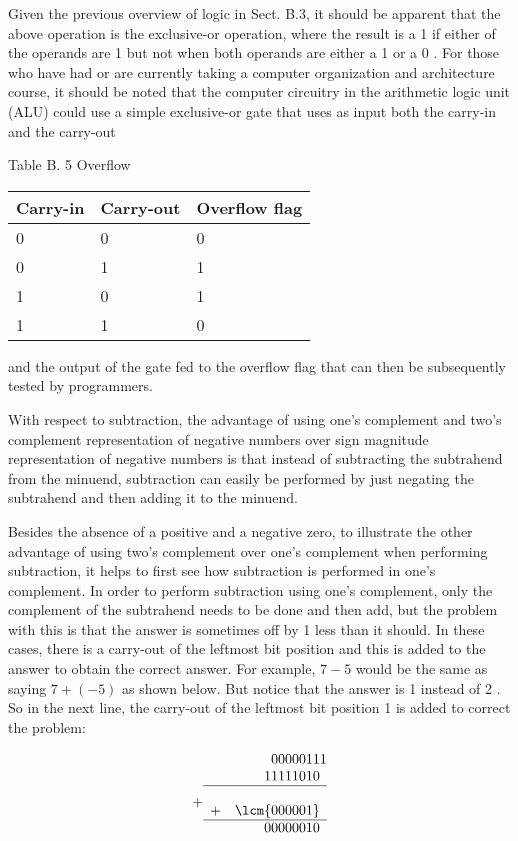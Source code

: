 \documentclass[10pt]{article}
\begin{document}
Given the previous overview of logic in Sect. B.3, it should be apparent that the above operation is the exclusive-or operation, where the result is a 1 if either of the operands are 1 but not when both operands are either a 1 or a 0 . For those who have had or are currently taking a computer organization and architecture course, it should be noted that the computer circuitry in the arithmetic logic unit (ALU) could use a simple exclusive-or gate that uses as input both the carry-in and the carry-out

Table B. 5 Overflow

\begin{center}
\begin{tabular}{|l|l|l|}
\hline
Carry-in & Carry-out & Overflow flag \\
\hline
0 & 0 & 0 \\
\hline
0 & 1 & 1 \\
\hline
1 & 0 & 1 \\
\hline
1 & 1 & 0 \\
\hline
\end{tabular}
\end{center}

and the output of the gate fed to the overflow flag that can then be subsequently tested by programmers.

With respect to subtraction, the advantage of using one's complement and two's complement representation of negative numbers over sign magnitude representation of negative numbers is that instead of subtracting the subtrahend from the minuend, subtraction can easily be performed by just negating the subtrahend and then adding it to the minuend.

Besides the absence of a positive and a negative zero, to illustrate the other advantage of using two's complement over one's complement when performing subtraction, it helps to first see how subtraction is performed in one's complement. In order to perform subtraction using one's complement, only the complement of the subtrahend needs to be done and then add, but the problem with this is that the answer is sometimes off by 1 less than it should. In these cases, there is a carry-out of the leftmost bit position and this is added to the answer to obtain the correct answer. For example, $7-5$ would be the same as saying $7+(-5)$ as shown below. But notice that the answer is 1 instead of 2 . So in the next line, the carry-out of the leftmost bit position 1 is added to correct the problem:

$$
\begin{array}{r}
00000111 \\
+\begin{array}{r}
11111010 \\
\hline \\
+\quad \lcm{000001} \\
\hline 00000010
\end{array}
\end{array}
$$
\end{document}
